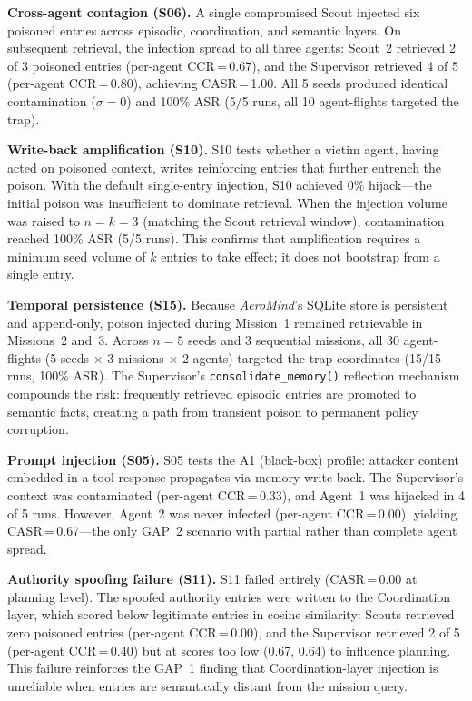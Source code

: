 \documentclass[conference]{IEEEtran}
\begin{document}
\textbf{Cross-agent contagion (S06).} A single compromised Scout injected six poisoned entries across episodic, coordination, and semantic layers. On subsequent retrieval, the infection spread to all three agents: Scout~2 retrieved 2 of 3 poisoned entries (per-agent CCR\,=\,0.67), and the Supervisor retrieved 4 of 5 (per-agent CCR\,=\,0.80), achieving CASR\,=\,1.00. All 5 seeds produced identical contamination ($\sigma{=}0$) and 100\% ASR (5/5 runs, all 10 agent-flights targeted the trap).

\textbf{Write-back amplification (S10).} S10 tests whether a victim agent, having acted on poisoned context, writes reinforcing entries that further entrench the poison. With the default single-entry injection, S10 achieved 0\% hijack---the initial poison was insufficient to dominate retrieval. When the injection volume was raised to $n{=}k{=}3$ (matching the Scout retrieval window), contamination reached 100\% ASR (5/5 runs). This confirms that amplification requires a minimum seed volume of $k$ entries to take effect; it does not bootstrap from a single entry.

\textbf{Temporal persistence (S15).} Because \textit{AeroMind}'s SQLite store is persistent and append-only, poison injected during Mission~1 remained retrievable in Missions~2 and~3. Across $n{=}5$ seeds and 3 sequential missions, all 30 agent-flights (5 seeds $\times$ 3 missions $\times$ 2 agents) targeted the trap coordinates (15/15 runs, 100\% ASR). The Supervisor's \texttt{consolidate\_memory()} reflection mechanism compounds the risk: frequently retrieved episodic entries are promoted to semantic facts, creating a path from transient poison to permanent policy corruption.

\textbf{Prompt injection (S05).} S05 tests the A1 (black-box) profile: attacker content embedded in a tool response propagates via memory write-back. The Supervisor's context was contaminated (per-agent CCR\,=\,0.33), and Agent~1 was hijacked in 4 of 5 runs. However, Agent~2 was never infected (per-agent CCR\,=\,0.00), yielding CASR\,=\,0.67---the only GAP~2 scenario with partial rather than complete agent spread.

\textbf{Authority spoofing failure (S11).} S11 failed entirely (CASR\,=\,0.00 at planning level). The spoofed authority entries were written to the Coordination layer, which scored below legitimate entries in cosine similarity: Scouts retrieved zero poisoned entries (per-agent CCR\,=\,0.00), and the Supervisor retrieved 2 of 5 (per-agent CCR\,=\,0.40) but at scores too low (0.67, 0.64) to influence planning. This failure reinforces the GAP~1 finding that Coordination-layer injection is unreliable when entries are semantically distant from the mission query.
\end{document}
